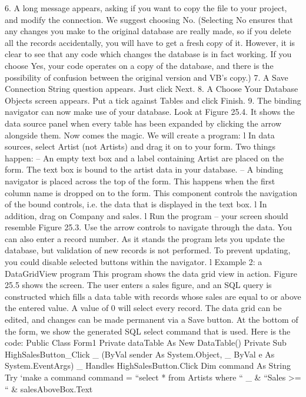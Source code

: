 6.	A long message appears, asking if you want to copy the ﬁle to your project, and modify the connection. We suggest choosing No.
	(Selecting No ensures that any changes you make to the original database are really made, so if you delete all the records accidentally, you will have to get 
a fresh copy of it. However, it is clear to see that any code which changes the database is in fact working. If you choose Yes, your code operates on a copy 
of the database, and there is the possibility of confusion between the original version and VB’s copy.)
7.	A Save Connection String question appears. Just click Next.
8.	A Choose Your Database Objects screen appears. Put a tick against Tables and click Finish.
9.	The binding navigator can now make use of your database.
Look at Figure 25.4. It shows the data source panel when every table has been expanded by clicking the arrow alongside them.
Now comes the magic. We will create a program:
l	In data sources, select Artist (not Artists) and drag it on to your form. Two things happen:
	–	An empty text box and a label containing Artist are placed on the form. The text box is bound to the artist data in your database.
	–	A binding navigator is placed across the top of the form. This happens when 
the ﬁrst column name is dropped on to the form. This component controls the navigation of the bound controls, i.e. the data that is displayed in the text box.
l	In addition, drag on Company and sales.
l	Run the program – your screen should resemble Figure 25.3. Use the arrow controls to navigate through the data. You can also enter a record number.
As it stands the program lets you update the database, but validation of new records 
is not performed. To prevent updating, you could disable selected buttons within the navigator.
l	Example 2: a DataGridView program
This program shows the data grid view in action. Figure 25.5 shows the screen. The user enters a sales ﬁgure, and an SQL query is constructed which ﬁlls a data table with records whose sales are equal to or above the entered value. A value of 0 will select every record. The data grid can be edited, and changes can be made permanent via a Save button. At the bottom of the form, we show the generated SQL select command that is used. Here is the code:
Public Class Form1
	Private dataTable As New DataTable()
	Private Sub HighSalesButton_Click _
		(ByVal sender As System.Object, _
		 ByVal e As System.EventArgs) _
		 Handles HighSalesButton.Click
		Dim command As String
		Try
			‘make a command
			command = “select * from Artists where “ _
					& “Sales >= “ & salesAboveBox.Text
